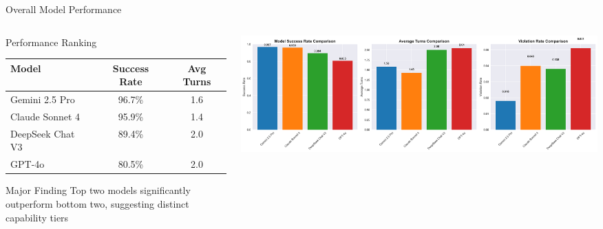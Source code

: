 \documentclass[aspectratio=169]{beamer}
\begin{document}
\begin{frame}{Overall Model Performance}
\begin{columns}[c]
\begin{column}{0.5\textwidth}
\begin{block}{Performance Ranking}
\begin{center}
\begin{tabular}{lcc}
\toprule
\textbf{Model} & \textbf{Success Rate} & \textbf{Avg Turns} \\
\midrule
Gemini 2.5 Pro & 96.7\% & 1.6 \\
Claude Sonnet 4 & 95.9\% & 1.4 \\
DeepSeek Chat V3 & 89.4\% & 2.0 \\
GPT-4o & 80.5\% & 2.0 \\
\bottomrule
\end{tabular}
\end{center}
\end{block}

\begin{alertblock}{Major Finding}
Top two models significantly outperform bottom two, suggesting distinct capability tiers
\end{alertblock}
\end{column}

\begin{column}{0.48\textwidth}
\begin{center}
\includegraphics[width=\textwidth]{presentation_figures/figure3_model_performance.png}
\end{center}
\end{column}
\end{columns}
\end{frame}
\end{document}
